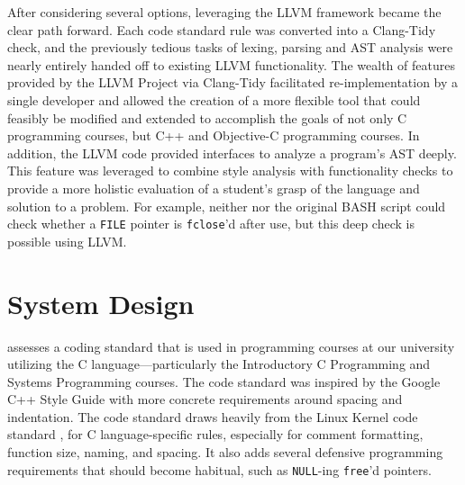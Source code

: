 \documentclass[sigconf]{acmart}
\begin{document}
After considering several options, leveraging the LLVM framework
became the clear path forward. Each code standard rule was converted into a Clang-Tidy \cite{ClangTidyChecks}
check, and the previously tedious tasks of lexing, parsing and AST analysis were nearly entirely handed off to
existing LLVM functionality. The wealth of features provided by the LLVM Project via Clang-Tidy facilitated
re-implementation by a single developer and allowed the creation of a more flexible tool that
could feasibly be modified and extended to accomplish the goals of not only C
programming courses, but C++ and Objective-C programming courses. In addition, the LLVM code provided interfaces to analyze a program’s AST deeply. This feature was
leveraged to combine style analysis with functionality checks to provide a more
holistic evaluation of a student's grasp of the language and solution to a problem. For example, neither
\oldtool{} nor the original BASH script could check whether a \texttt{FILE} pointer is \texttt{fclose}'d
after use, but this deep check is possible using LLVM.

\section{System Design}\label{sec:systemdesign}

\tool{} assesses a coding standard that is used in programming courses at our university utilizing the C language---particularly the Introductory C Programming and Systems Programming courses. The code standard was 
inspired by the Google C++ Style Guide \cite{cpplint} with more concrete requirements
around spacing and indentation. The code standard draws heavily from
the Linux Kernel code standard \cite{LinuxCodingStandard}, for C language-specific rules, especially for comment formatting, function size, naming, and spacing.  It also adds several defensive programming requirements that should become
habitual, such as \texttt{NULL}-ing \texttt{free}'d pointers.
\end{document}
